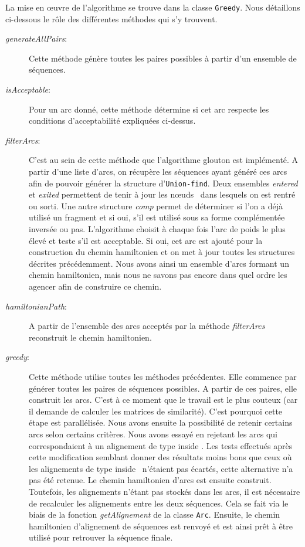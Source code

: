 La mise en \oe{}uvre de l'algorithme se trouve dans la classe \verb|Greedy|. Nous détaillons ci-dessous le rôle des différentes méthodes qui s'y trouvent.

\begin{description}
	\item[\emph{generateAllPairs}:] Cette méthode génère toutes les paires possibles à partir d'un ensemble de séquences.
	\item[\emph{isAcceptable}:] Pour un arc donné, cette méthode détermine si cet arc respecte les conditions d'acceptabilité expliquées ci-dessus.
	\item[\emph{filterArcs}:] C'est au sein de cette méthode que l'algorithme
		glouton est implémenté. A partir d'une liste d'arcs, on récupère les
		séquences ayant généré ces arcs afin de pouvoir générer la structure
		d'\verb|Union-find|. Deux ensembles \emph{entered} et \emph{exited}
		permettent de tenir à jour les \og n\oe{}uds \fg~dans lesquels on est
		rentré ou sorti. Une autre structure \emph{comp} permet de déterminer si
		l'on a déjà utilisé un fragment et si oui, s'il est utilisé sous sa
		forme complémentée inversée ou pas. L'algorithme choisit à chaque fois
		l'arc de poids le plus élevé et teste s'il est acceptable. Si oui, cet
		arc est ajouté pour la construction du chemin hamiltonien et on met à
		jour toutes les structures décrites précédemment. Nous avons ainsi un
		ensemble d'arcs formant un chemin hamiltonien, mais nous ne savons pas
		encore dans quel ordre les agencer afin de construire ce chemin.
	\item[\emph{hamiltonianPath}:] A partir de l'ensemble des arcs acceptés par
		la méthode \emph{filterArcs} reconstruit le chemin hamiltonien.
	\item[\emph{greedy}:] Cette méthode utilise toutes les méthodes précédentes.
		Elle commence par générer toutes les paires de séquences possibles. A
		partir de ces paires, elle construit les arcs. C'est à ce moment que le
		travail est le plus couteux (car il demande de calculer les matrices de
		similarité). C'est pourquoi cette étape est parallélisée. Nous avons
		ensuite la possibilité de retenir certains arcs selon certains critères.
		Nous avons essayé en rejetant les arcs qui correspondaient à un
		alignement de type \og inside \fg. Les tests effectués après cette
		modification semblant donner des résultats moins bons que ceux où les
		alignements de type \og inside \fg~n'étaient pas écartés, cette
		alternative n'a pas été retenue. Le chemin hamiltonien d'arcs est
		ensuite construit. Toutefois, les alignements n'étant pas stockés dans
		les arcs, il est nécessaire de recalculer les alignements entre les deux
		séquences. Cela se fait via le biais de la fonction \emph{getAlignement}
		de la classe \verb|Arc|.
		Ensuite, le chemin hamiltonien d'alignement de séquences est renvoyé et est
		ainsi prêt à être utilisé pour retrouver la séquence finale.
\end{description}

